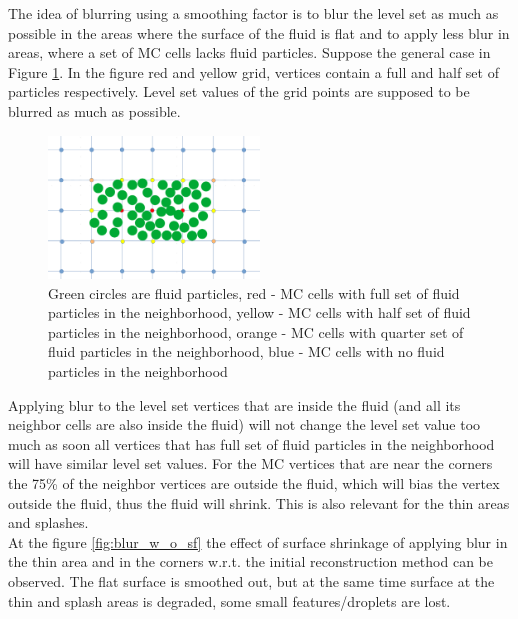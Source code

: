 The idea of blurring using a smoothing factor is to blur the level set as much as possible in the areas where the surface of the fluid is flat and to apply less blur in areas, where a set of MC cells lacks fluid particles. Suppose the general case in Figure \ref{fig:sf_example}. In the figure red and yellow grid, vertices contain a full and half set of particles respectively. Level set values of the grid points are supposed to be blurred as much as possible.
\begin{figure}[H]
	\begin{center}
		\includegraphics[width=0.5\textwidth]{figures/SmoothingFactorPictureExplenation.png}		
		\caption{Green circles are fluid particles, red - MC cells with full set of fluid particles in the neighborhood, yellow -  MC cells with half set of fluid particles in the neighborhood, orange - MC cells with quarter set of fluid particles in the neighborhood, blue - MC cells with no fluid particles in the neighborhood}
		\label{fig:sf_example}
	\end{center}
\end{figure}
Applying blur to the level set vertices that are inside the fluid (and all its neighbor cells are also inside the fluid) will not change the level set value too much as soon all vertices that has full set of fluid particles in the neighborhood will have similar level set values. 
For the MC vertices that are near the corners the 75\% of the neighbor vertices are outside the fluid, which will bias the vertex outside the fluid, thus the fluid will shrink. This is also relevant for the thin areas and splashes.\\
At the figure \ref{fig:blur_w_o_sf} the effect of surface shrinkage of applying blur in the thin area and in the corners w.r.t. the initial reconstruction method can be observed. The flat surface is smoothed out, but at the same time surface at the thin and splash areas is degraded, some small features/droplets are lost.
